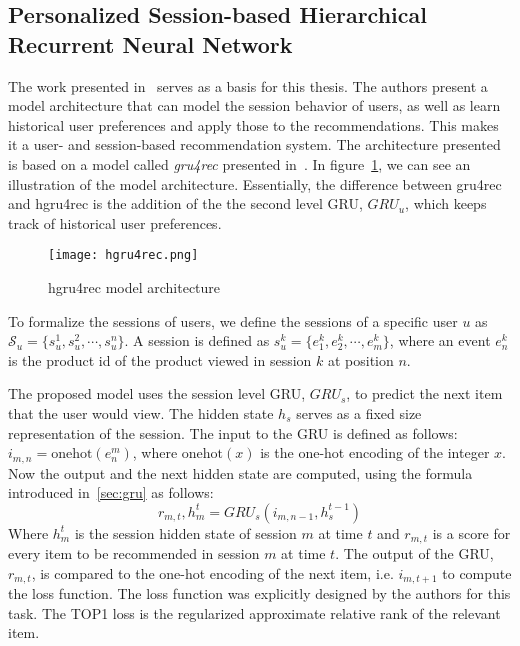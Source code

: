 \subsection{Personalized Session-based Hierarchical Recurrent Neural Network}\label{sec:hgru4rec}
The work presented in~\cite{hierarchical} serves as a basis for this thesis.
The authors present a model architecture that can model the session behavior of users, as well as learn historical user preferences and apply those to the recommendations.
This makes it a user- and session-based recommendation system.
The architecture presented is based on a model called \emph{gru4rec} presented in~\cite{gru4rec}.
In figure~\ref{fig:hgru4rec}, we can see an illustration of the model architecture.
Essentially, the difference between gru4rec and hgru4rec is the addition of the the second level GRU, $GRU_{u}$, which keeps track of historical user preferences.
\begin{figure}[t]
	\centering
	\captionsetup{width=0.8\textwidth}
    \texttt{[image: hgru4rec.png]}
    \caption{hgru4rec model architecture}
    \label{fig:hgru4rec}
\end{figure}
To formalize the sessions of users, we define the sessions of a specific user $u$ as $\mathcal{S}_u = \lbrace s_u^1, s_u^2, \cdots, s_u^n \rbrace $.
A session is defined as $s_u^k = \lbrace e^k_1, e^k_2, \cdots, e^k_m \rbrace $, where an event $e^k_n$ is the product id of the product viewed in session $k$ at position $n$.
\par
The proposed model uses the session level GRU, $GRU_s$, to predict the next item that the user would view.
The hidden state $h_s$ serves as a fixed size representation of the session.
The input to the GRU is defined as follows: $i_{m,n} = \text{onehot} ( e^m_n )$, where $\text{onehot}(x)$ is the one-hot encoding of the integer $x$.
Now the output and the next hidden state are computed, using the formula introduced in~\ref{sec:gru} as follows:
\begin{equation}\label{eq:hgru4rec_session}
    r_{m,t}, h_m^{t} = GRU_s(i_{m,n-1}, h_s^{t-1})
\end{equation}
Where $h_m^{t}$ is the session hidden state of session $m$ at time $t$ and $r_{m,t}$ is a score for every item to be recommended in session $m$ at time $t$.
The output of the GRU, $r_{m,t}$, is compared to the one-hot encoding of the next item, i.e. $i_{m,t+1}$ to compute the loss function.
The loss function was explicitly designed by the authors for this task.
The TOP1 loss is the regularized approximate relative rank of the relevant item.
